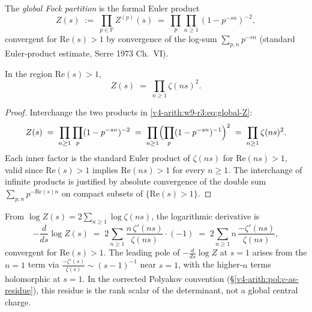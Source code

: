 \begin{definition}
\label{v4-arith:w9-r3:def:global-partition}
The \emph{global Fock partition} is the
formal Euler product
\begin{equation}
\label{v4-arith:w9-r3:eq:global-Z}
Z(s)\;:=\;\prod_{p\in\mathbb{P}}Z^{(p)}(s)\;=\;\prod_{p}\prod_{n\geq 1}(1-p^{-sn})^{-2},
\end{equation}
convergent for \(\mathrm{Re}(s)>1\) by convergence of the log-sum
\(\sum_{p,n}p^{-sn}\) (standard Euler-product estimate, Serre 1973
Ch.~VI).
\end{definition}

\begin{lemma}
\label{v4-arith:w9-r3:lem:Z-is-zeta-prod}
In the region \(\mathrm{Re}(s)>1\),
\begin{equation}
\label{v4-arith:w9-r3:eq:Z-is-zeta-prod}
Z(s)\;=\;\prod_{n\geq 1}\zeta(ns)^{2}.
\end{equation}
\end{lemma}

\begin{proof}
Interchange the two products in \eqref{v4-arith:w9-r3:eq:global-Z}:
\[
Z(s)\;=\;\prod_{n\geq 1}\prod_{p}(1-p^{-sn})^{-2}\;=\;\prod_{n\geq 1}\Bigl(\prod_{p}(1-p^{-sn})^{-1}\Bigr)^{2}\;=\;\prod_{n\geq 1}\zeta(ns)^{2}.
\]
Each inner factor is the standard Euler product of \(\zeta(ns)\) for
\(\mathrm{Re}(ns)>1\), valid since \(\mathrm{Re}(s)>1\) implies
\(\mathrm{Re}(ns)>1\) for every \(n\geq 1\). The interchange of infinite
products is justified by absolute convergence of the double sum
\(\sum_{p,n}p^{-\mathrm{Re}(s)n}\) on compact subsets of
\(\{\mathrm{Re}(s)>1\}\).
\end{proof}

\begin{remark}
\label{v4-arith:w9-r3:rem:log-Z-central}
From \(\log Z(s)=2\sum_{n\geq 1}\log\zeta(ns)\), the logarithmic derivative is
\begin{equation}
\label{v4-arith:w9-r3:eq:log-Z-prime}
-\frac{d}{ds}\log Z(s)\;=\;2\sum_{n\geq 1}\frac{n\,\zeta'(ns)}{\zeta(ns)}\cdot(-1)\;=\;2\sum_{n\geq 1}n\,\frac{-\zeta'(ns)}{\zeta(ns)},
\end{equation}
convergent for \(\mathrm{Re}(s)>1\). The leading pole of \(-\frac{d}{ds}\log Z\) at
\(s=1\) arises from the \(n=1\) term via \(\frac{-\zeta'(s)}{\zeta(s)}\sim (s-1)^{-1}\)
near \(s=1\), with the higher-\(n\) terms holomorphic at \(s=1\).
In the corrected Polyakov convention
(\S\ref{v4-arith:pol:c-as-residue}), this residue is the rank scalar
of the determinant, not a global central charge.
\end{remark}

